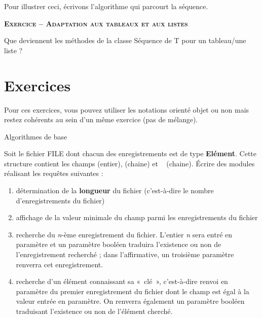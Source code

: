 
Pour illustrer ceci, écrivons l'algorithme qui parcourt
la séquence.


\bigskip

{\sffamily\bfseries\scshape
Exercice – Adaptation aux tableaux et aux listes}

Que deviennent les méthodes de la classe Séquence de T pour un
tableau/une liste ?

\section{Exercices}

Pour ces exercices, vous pouvez utiliser les notations orienté objet ou
non mais restez cohérents au sein d'un même exercice
(pas de mélange).

\begin{Exercice}{Algorithmes de base}
	
	Soit le fichier FILE dont chacun des enregistrements est de type
	\textbf{Elément}. Cette structure contient les champs
	 (entier),  (chaine)
	et \  (chaine). Écrire des modules réalisant
	les requêtes suivantes :

	\begin{enumerate}[label=\alph*)]
		\item 
			détermination de la \textbf{longueur} du fichier (c’est-à-dire le nombre
			d’enregistrements du fichier)
		\item 
			affichage de la valeur minimale du champ 
			parmi les enregistrements du fichier
		\item
			recherche du \textit{n}{}-ème enregistrement du fichier. L’entier
			\textit{n} sera entré en paramètre et un paramètre booléen traduira
			l’existence ou non de l’enregistrement recherché ; dans l’affirmative,
			un troisième paramètre renverra cet enregistrement.
		\item 
			recherche d’un élément connaissant sa «~clé~», c’est-à-dire renvoi en
			paramètre du premier enregistrement du fichier dont le champ
			 est égal à la valeur 
			entrée en paramètre. On renverra également un paramètre booléen
			traduisant l’existence ou non de l’élément cherché. 
	\end{enumerate}
\end{Exercice}

